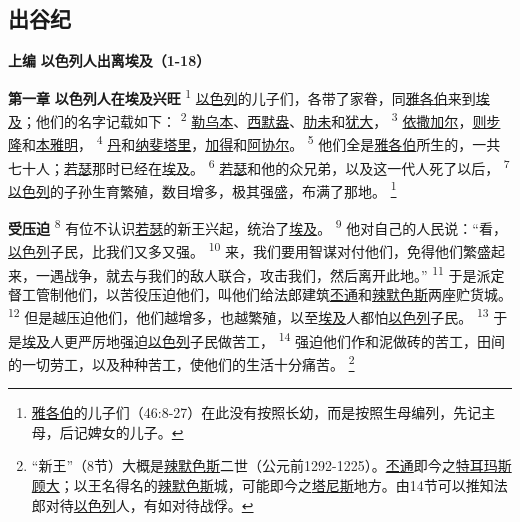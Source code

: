 \setlength\columnsep{0.8cm}
\begin{multicols}{2}

\chapter*{出谷纪}


\begin{center}
	\textbf{上编 }
	\textbf{以色列人出离埃及（1-18）}
\end{center}

\textbf{第一章 }
\textbf{以色列人在埃及兴旺 }
\textsuperscript{1}
\uline{以色列}的儿子们，各带了家眷，同\uline{雅各伯}来到\uline{埃及}；他们的名字记载如下：
\textsuperscript{2}
\uline{勒乌本}、\uline{西默盎}、\uline{肋未}和\uline{犹大}，
\textsuperscript{3}
\uline{依撒}\uline{加尔}，\uline{则步隆}和\uline{本雅明}，
\textsuperscript{4}
\uline{丹}和\uline{纳斐塔里}，\uline{加得}和\uline{阿协尔}。
\textsuperscript{5}
他们全是\uline{雅各伯}所生的，一共七十人；\uline{若瑟}那时已经在\uline{埃及}。
\textsuperscript{6}
\uline{若瑟}和他的众兄弟，以及这一代人死了以后，
\textsuperscript{7}
\uline{以色列}的子孙生育繁殖，数目增多，极其强盛，布满了那地。
\renewcommand\thefootnote{\ding{\numexpr171+\value{footnote}}}
\footnote{\uline{雅各伯}的儿子们（46:8-27）在此没有按照长幼，而是按照生母编列，先记主母，后记婢女的儿子。}

\textbf{受压迫 }
\textsuperscript{8}
有位不认识\uline{若瑟}的新王兴起，统治了\uline{埃及}。
\textsuperscript{9}
他对自己的人民说：“看，\uline{以色列}子民，比我们又多又强。
\textsuperscript{10}
来，我们要用智谋对付他们，免得他们繁盛起来，一遇战争，就去与我们的敌人联合，攻击我们，然后离开此地。”
\textsuperscript{11}
于是派定督工管制他们，以苦役压迫他们，叫他们给法郎建筑\uline{丕通}和\uline{辣默}\uline{色斯}两座贮货城。
\textsuperscript{12}
但是越压迫他们，他们越增多，也越繁殖，以至\uline{埃及}人都怕\uline{以色列}子民。
\textsuperscript{13}
于是\uline{埃及}人更严厉地强迫\uline{以色列}子民做苦工，
\textsuperscript{14}
强迫他们作和泥做砖的苦工，田间的一切劳工，以及种种苦工，使他们的生活十分痛苦。
\footnote{“新王”（8节）大概是\uline{辣默色斯}二世（公元前1292-1225）。\uline{丕通}即今之\uline{特耳玛斯}\uline{顾大}；以王名得名的\uline{辣默色斯}城，可能即今之\uline{塔尼斯}地方。由14节可以推知法郎对待\uline{以色列}人，有如对待战俘。}


\end{multicols}
